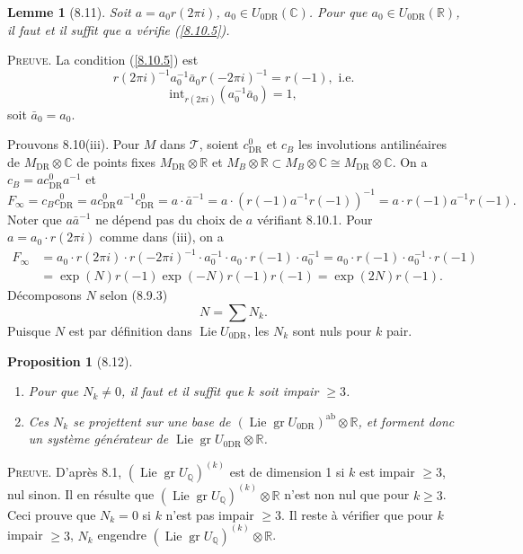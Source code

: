 \documentclass[12pt,a4paper]{article}
\theoremstyle{plain}
\newtheorem{lemma}[theorem]{Lemme}
\newtheorem{proposition}[theorem]{Proposition}
\theoremstyle{definition}
\theoremstyle{remark}
\DeclareMathOperator{\Lie}{Lie}
\DeclareMathOperator{\gr}{gr}
\newcommand{\Q}{\mathbb{Q}}
\newcommand{\C}{\mathbb{C}}
\newcommand{\R}{\mathbb{R}}
\newcommand{\DR}{\mathrm{DR}}
\begin{document}
\begin{lemma}[8.11]
Soit $a = a_0 r(2\pi i)$, $a_0 \in U_{0\DR}(\C)$. Pour que $a_0 \in U_{0\DR}(\R)$, il faut et il suffit que $a$ v\'erifie (\ref{8.10.5}).
\end{lemma}

\textsc{Preuve.} La condition (\ref{8.10.5}) est
$$r(2\pi i)^{-1} a_0^{-1} \bar{a}_0 r(-2\pi i)^{-1} = r(-1), \text{ i.e.}$$
$$\mathrm{int}_{r(2\pi i)}(a_0^{-1}\bar{a}_0) = 1,$$
soit $\bar{a}_0 = a_0$.

Prouvons 8.10(iii). Pour $M$ dans $\mathcal{T}$, soient $c_{\DR}^0$ et $c_B$ les involutions antilin\'eaires de $M_{\DR} \otimes \C$ de points fixes $M_{\DR} \otimes \R$ et $M_B \otimes \R \subset M_B \otimes \C \cong M_{\DR} \otimes \C$. On a $c_B = a c_{\DR}^0 a^{-1}$ et
$$F_\infty = c_B c_{\DR}^0 = a c_{\DR}^0 a^{-1} c_{\DR}^0 = a \cdot \bar{a}^{-1} = a \cdot (r(-1)a^{-1}r(-1))^{-1} = a \cdot r(-1) a^{-1} r(-1).$$
Noter que $a\bar{a}^{-1}$ ne d\'epend pas du choix de $a$ v\'erifiant 8.10.1. Pour $a = a_0 \cdot r(2\pi i)$ comme dans (iii), on a
\begin{align*}
F_\infty &= a_0 \cdot r(2\pi i) \cdot r(-2\pi i)^{-1} \cdot a_0^{-1} \cdot a_0 \cdot r(-1) \cdot a_0^{-1} = a_0 \cdot r(-1) \cdot a_0^{-1} \cdot r(-1) \\
&= \exp(N)r(-1)\exp(-N)r(-1)r(-1) = \exp(2N)r(-1).
\end{align*}
D\'ecomposons $N$ selon (8.9.3)
$$N = \sum N_k.$$
Puisque $N$ est par d\'efinition dans $\Lie U_{0\DR}$, les $N_k$ sont nuls pour $k$ pair.

\begin{proposition}[8.12]
\leavevmode
\begin{enumerate}[label=(\roman*)]
\item Pour que $N_k \neq 0$, il faut et il suffit que $k$ soit impair $\geq 3$.
\item Ces $N_k$ se projettent sur une base de $(\Lie \gr U_{0\DR})^{\mathrm{ab}} \otimes \R$, et forment donc un syst\`eme g\'en\'erateur de $\Lie \gr U_{0\DR} \otimes \R$.
\end{enumerate}
\end{proposition}

\textsc{Preuve.} D'apr\`es 8.1, $(\Lie \gr U_\Q)^{(k)}$ est de dimension 1 si $k$ est impair $\geq 3$, nul sinon. Il en r\'esulte que $(\Lie \gr U_\Q)^{(k)} \otimes \R$ n'est non nul que pour $k \geq 3$. Ceci prouve que $N_k = 0$ si $k$ n'est pas impair $\geq 3$. Il reste \`a v\'erifier que pour $k$ impair $\geq 3$, $N_k$ engendre $(\Lie \gr U_\Q)^{(k)} \otimes \R$.
\end{document}
